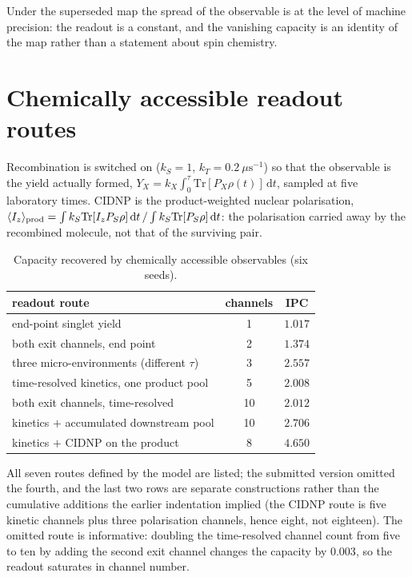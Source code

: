 \documentclass[aps,prx,reprint,superscriptaddress,nofootinbib,floatfix]{revtex4-2}
\begin{document}
Under the superseded map the spread of the observable is at the level of machine
precision: the readout is a constant, and the vanishing capacity is an identity of
the map rather than a statement about spin chemistry.

\section{Chemically accessible readout routes}
\label{sec:routes}
Recombination is switched on ($k_S=1$, $k_T=0.2~\mu\mathrm{s}^{-1}$) so that the
observable is the yield actually formed,
$Y_X=k_X\!\int_0^\tau\!\mathrm{Tr}[P_X\rho(t)]\,\mathrm{d}t$, sampled at five
laboratory times. CIDNP is the product-weighted nuclear polarisation,
$\langle I_z\rangle_{\rm prod}=\int k_S\mathrm{Tr}[I_zP_S\rho]\,\mathrm{d}t\,/
\int k_S\mathrm{Tr}[P_S\rho]\,\mathrm{d}t$: the polarisation carried away by the
recombined molecule, not that of the surviving pair.

\begin{table}[H]
\caption{\label{tab:routes}Capacity recovered by chemically accessible observables
(six seeds).}
\begin{ruledtabular}
\begin{tabular}{lcc}
readout route & channels & IPC \\
\hline
end-point singlet yield & 1 & $1.017$ \\
both exit channels, end point & 2 & $1.374$ \\
three micro-environments (different $\tau$) & 3 & $2.557$ \\
time-resolved kinetics, one product pool & 5 & $2.008$ \\
both exit channels, time-resolved & 10 & $2.012$ \\
kinetics $+$ accumulated downstream pool & 10 & $2.706$ \\
kinetics $+$ CIDNP on the product & 8 & $4.650$ \\
\end{tabular}
\end{ruledtabular}
\end{table}

All seven routes defined by the model are listed; the submitted version omitted
the fourth, and the last two rows are separate constructions rather than the
cumulative additions the earlier indentation implied (the CIDNP route is five
kinetic channels plus three polarisation channels, hence eight, not eighteen).
The omitted route is informative: doubling the time-resolved channel count from
five to ten by adding the second exit channel changes the capacity by $0.003$, so
the readout saturates in channel number.
\end{document}
